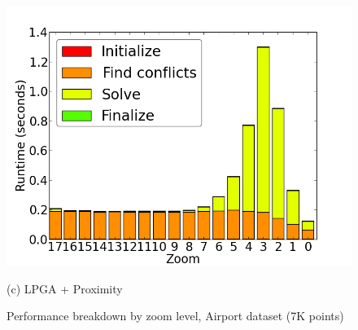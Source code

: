 \begin{figure}[tb]
\begin{minipage}{0.329\linewidth}
    \centerline{\includegraphics[width=1.0\linewidth]{./figs/prelim_pnt_7k_airports_lp_B.png}}
    \centerline{(c) LPGA + Proximity}
  \end{minipage}
  \vspace{-0ex}
  \caption{Performance breakdown by zoom level, Airport dataset (7K points)} \label{fig:performance:airport}
  \vspace{-2ex}
\end{figure}

